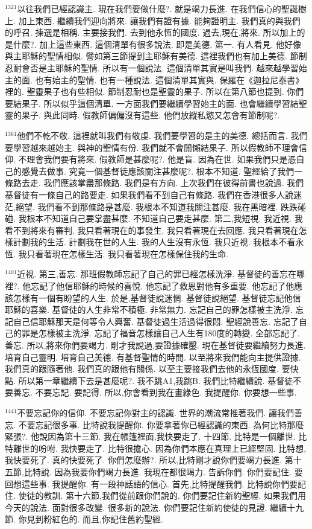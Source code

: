 \documentclass{book}
\begin{document}
$^{1321}$以往我們已經認識主.
現在我們要做什麼?.
就是竭力長進.
在我們信心的聖誕樹上.
加上東西.
繼續我們迎向將來.
讓我們有證有據.
能夠證明主.
我們真的與我們的呼召.
揀選是相稱.
主要接我們.
去到他永恆的國度.
過去,現在,將來.
所以加上的是什麼?.
加上這些東西.
這個清單有很多說法.
即是美德.
第一.
有人看見.
他好像與主耶穌的聖情相似.
譬如第三節提到主耶穌有美德.
這裡我們也有加上美德.
節制忍耐會否是主耶穌的聖情.
所以有一個說法.
這個清單其實是叫我們.
越來越學習始主的面.
也有始主的聖情.
也有一種說法.
這個清單其實與.
保羅在《迦拉尼泰書》裡的.
聖靈果子也有些相似.
節制忍耐也是聖靈的果子.
所以在第八節也提到.
你們要結果子.
所以似乎這個清單.
一方面我們要繼續學習始主的面.
也會繼續學習結聖靈的果子.
與此同時.
假教師偏偏沒有這些.
他們放縱私慾又怎會有節制呢?.

$^{1361}$他們不乾不敬.
這裡就叫我們有敬虔.
我們要學習的是主的美德.
總括而言.
我們要學習越來越始主.
與神的聖情有份.
我們就不會閒懶結果子.
所以假教師不理會信仰.
不理會我們要有將來.
假教師是甚麼呢?.
他是盲.
因為在世.
如果我們只是憑自己的感覺去做事.
究竟一個基督徒應該關注甚麼呢?.
根本不知道.
聖經給了我們一條路去走.
我們應該掌盡那條路.
我們是有方向.
上次我們在彼得前書也說過.
我們基督徒有一條自己的路要走.
如果我們看不到自己有條路.
我們在香港很多人說迷茫,絕望.
我們看不到那條路是甚麼.
我根本不知道我關注甚麼.
我在黑暗裡.
跌跌碰碰.
我根本不知道自己要掌盡甚麼.
不知道自己要走甚麼.
第二,我短視.
我近視.
我看不到將來有審判.
我只看著現在的事發生.
我只看著現在去回應.
我只看著現在怎樣計劃我的生活.
計劃我在世的人生.
我的人生沒有永恆.
我只近視.
我根本不看永恆.
我只看著現在怎樣生活.
我只看著現在怎樣保住我的生命.

$^{1401}$近視.
第三,善忘.
那班假教師忘記了自己的罪已經怎樣洗淨.
基督徒的善忘在哪裡?.
他忘記了他信耶穌的時候的喜悅.
他忘記了救恩對他有多重要.
他忘記了他應該怎樣有一個有盼望的人生.
於是,基督徒說迷惘.
基督徒說絕望.
基督徒忘記他信耶穌的喜樂.
基督徒的人生非常不積極.
非常無力.
忘記自己的罪怎樣被主洗淨.
忘記自己信耶穌那天是何等令人興奮.
基督徒過生活過得很悶.
聖經說善忘.
忘記了自己的罪是怎樣被主洗淨.
忘記了福音怎樣讓自己人生有180度的轉變.
全部忘記了.
善忘.
所以,將來你們要竭力.
剛才我說過,要證據確鑿.
現在基督徒要繼續努力長進.
培育自己靈明.
培育自己美德.
有基督聖情的時間.
以至將來我們能向主提供證據.
我們真的跟隨著他.
我們真的跟他有關係.
以至主要接我們去他的永恆國度.
要快點.
所以第一章繼續下去是甚麼呢?.
我不跳A1,我跳B.
我們比特繼續說.
基督徒不要善忘.
不要忘記.
要記得.
所以,你會看到我在畫綠色.
我提醒你.
你要想一些事.

$^{1441}$不要忘記你的信仰.
不要忘記你對主的認識.
世界的潮流常推著我們.
讓我們善忘.
不要忘記很多事.
比特說我提醒你.
你要拿著你已經認識的東西.
為何比特那麼緊張?.
他說因為第十三節.
我在帳篷裡面,我快要走了.
十四節.
比特是一個離世.
比特離世的吩咐.
我快要走了.
比特很擔心.
因為你們本應在真理上已經堅固.
比特想,我快要死了.
真的快要死了.
你們怎麼辦?.
所以,比特剛才說你們要竭力長進.
第十五節,比特說.
因為我要你們竭力長進.
我現在都很竭力.
告訴你們.
你們要記住.
要回想這些事.
我提醒你.
有一段神話語的信心.
首先,比特提醒我們.
比特說你們要記住.
使徒的教訓.
第十六節,我們從前跟你們說的.
你們要記住新約聖經.
如果我們用今天的說法.
面對很多改變.
很多新的說法.
你們要記住新約使徒的見證.
繼續十九節.
你見到粉紅色的.
而且,你記住舊約聖經.
\end{document}

